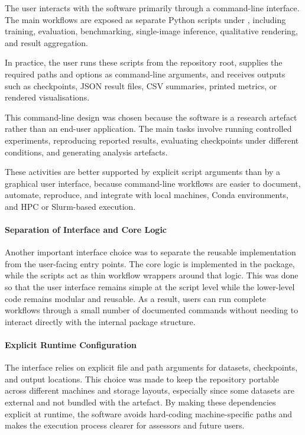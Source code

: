 ﻿\documentclass[11pt,a4paper]{article}
\begin{document}
The user interacts with the software primarily through a command-line
interface. The main workflows are exposed as separate Python scripts under
, including training, evaluation, benchmarking, single-image
inference, qualitative rendering, and result aggregation.

\medskip

\noindent
In practice, the user runs these scripts from the repository root, supplies
the required paths and options as command-line arguments, and receives outputs
such as checkpoints, JSON result files, CSV summaries, printed metrics, or
rendered visualisations.

\medskip

\noindent
This command-line design was chosen because the software is a research
artefact rather than an end-user application. The main tasks involve running
controlled experiments, reproducing reported results, evaluating checkpoints
under different conditions, and generating analysis artefacts.

\medskip

\noindent
These activities are better supported by explicit script arguments than by a
graphical user interface, because command-line workflows are easier to
document, automate, reproduce, and integrate with local machines, Conda
environments, and HPC or Slurm-based execution.

\paragraph*{Separation of Interface and Core Logic}

Another important interface choice was to separate the reusable
implementation from the user-facing entry points. The core logic is
implemented in the  package, while the scripts act as
thin workflow wrappers around that logic. This was done so that the user
interface remains simple at the script level while the lower-level code
remains modular and reusable. As a result, users can run complete workflows
through a small number of documented commands without needing to interact
directly with the internal package structure.

\paragraph*{Explicit Runtime Configuration}

The interface relies on explicit file and path arguments for datasets,
checkpoints, and output locations. This choice was made to keep the
repository portable across different machines and storage layouts, especially
since some datasets are external and not bundled with the artefact. By
making these dependencies explicit at runtime, the software avoids hard-coding
machine-specific paths and makes the execution process clearer for assessors
and future users.
\end{document}
